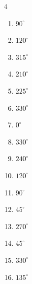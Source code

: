 \begin{multicols}{4}
\begin{enumerate}
  \item $\displaystyle 90^{\circ}$

  \item $\displaystyle 120^{\circ}$

  \item $\displaystyle 315^{\circ}$

  \item $\displaystyle 210^{\circ}$

  \item $\displaystyle 225^{\circ}$

  \item $\displaystyle 330^{\circ}$

  \item $\displaystyle 0^{\circ}$
        \phantom{$\displaystyle =0$}

  \item $\displaystyle 330^{\circ}$

  \item $\displaystyle 240^{\circ}$

  \item $\displaystyle 120^{\circ}$

  \item $\displaystyle 90^{\circ}$

  \item $\displaystyle 45^{\circ}$

  \item $\displaystyle 270^{\circ}$

  \item $\displaystyle 45^{\circ}$

  \item $\displaystyle 330^{\circ}$

  \item $\displaystyle 135^{\circ}$


\end{enumerate}
\end{multicols}
